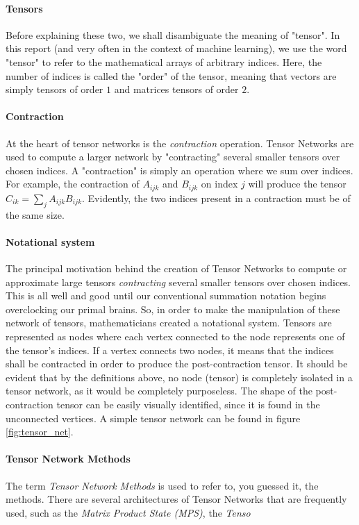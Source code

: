 \documentclass[11pt]{article}
\begin{document}
\paragraph{Tensors}
Before explaining these two, we shall 
disambiguate the meaning of "tensor". In this report (and very often in the context
of machine learning), we use the word "tensor" to refer to the mathematical arrays
of arbitrary indices. Here, the number of indices is called the "order" of the 
tensor, meaning that vectors are simply tensors of order $1$ and matrices tensors 
of order $2$. 

\paragraph{Contraction}
At the heart of tensor networks is the {\it contraction} operation.
Tensor Networks are used to compute a larger network by "contracting" several
smaller tensors over chosen indices. A "contraction" is simply an operation 
where we sum over indices. For example, the contraction of $A_{ijk}$ and 
$B_{ijk}$ on index $j$ will produce the tensor $C_{ik} = \sum_{j} A_{ijk} B_{ijk}$.
Evidently, the two indices present in a contraction must be of the same size.

\paragraph{Notational system}
The principal motivation behind the creation of Tensor Networks 
to compute or approximate large tensors {\it contracting} several
smaller tensors over chosen indices. This is all well and good until 
our conventional summation notation begins overclocking our primal brains.
So, in order to make the manipulation of these network of tensors, mathematicians
created a notational system. Tensors are represented as nodes where each 
vertex connected to the node represents one of the tensor's indices. 
If a vertex connects two nodes, it means that the indices shall be contracted 
in order to produce the post-contraction tensor. It should be evident that
by the definitions above, no node (tensor) is completely isolated in a tensor network,
as it would be completely purposeless. The shape of the post-contraction tensor 
can be easily visually identified, since it is found in the unconnected vertices.
A simple tensor network can be found in figure \ref{fig:tensor_net}.

\paragraph{Tensor Network Methods}
The term {\it Tensor Network Methods} is used to refer to, you guessed it, the methods.
There are several architectures of Tensor Networks that are frequently used, such 
as the {\it Matrix Product State (MPS)}, the {\it Tenso}
\end{document}
